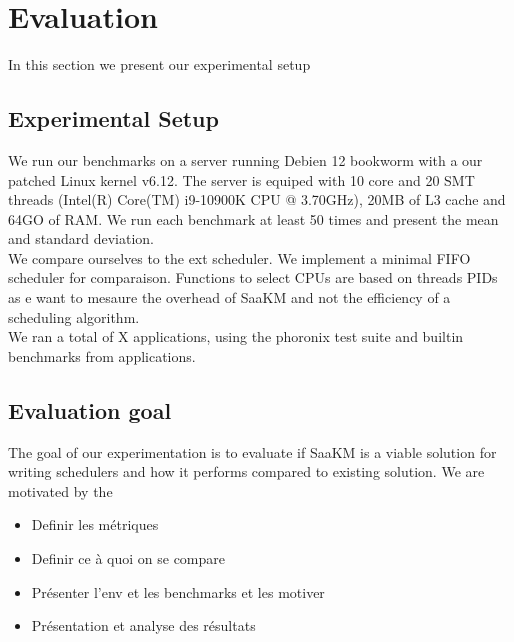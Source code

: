 \section{Evaluation}

\par In this section we present our experimental setup

\subsection{Experimental Setup}
\par We run our benchmarks on a server running Debien 12 bookworm with a our patched Linux kernel v6.12. The server is equiped with 10 core and 20 SMT threads (Intel(R) Core(TM) i9-10900K CPU @ 3.70GHz), 20MB of L3 cache and 64GO of RAM. We run each benchmark at least 50 times and present the mean and standard deviation. \\
We compare ourselves to the ext scheduler. We implement a minimal FIFO scheduler for comparaison. Functions to select CPUs are based on threads PIDs as e want to mesaure the overhead of SaaKM and not the efficiency of a scheduling algorithm. \\
We ran a total of X applications, using the phoronix test suite and builtin benchmarks from applications. \newpage

\subsection{Evaluation goal}
\par The goal of our experimentation is to evaluate if SaaKM is a viable solution for writing schedulers and how it performs compared to existing solution. We are motivated by the

\begin{itemize}
        \item Definir les métriques
        \item Definir ce à quoi on se compare
        \item Présenter l'env et les benchmarks et les motiver
        \item Présentation et analyse des résultats
\end{itemize}